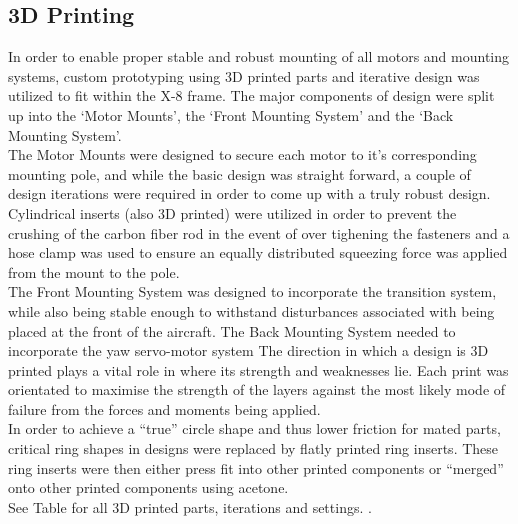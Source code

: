 \subsection{3D Printing}
In order to enable proper stable and robust mounting of all motors and mounting systems, custom prototyping using 3D printed parts and iterative design was utilized to fit within the X-8 frame. The major components of design were split up into the `Motor Mounts', the `Front  Mounting System' and the `Back Mounting System'.\\
The Motor Mounts were designed to secure each motor to it's corresponding mounting pole, and while the basic design was straight forward, a couple of design iterations were required in order to come up with a truly robust design. Cylindrical inserts (also 3D printed) were utilized in order to prevent the crushing of the carbon fiber rod in the event of over tighening the fasteners and a hose clamp was used to ensure an equally distributed squeezing force was applied from the mount to the pole.\\
The Front Mounting System was designed to incorporate the transition system, while also being stable enough to withstand disturbances associated with being placed at the front of the aircraft.
The Back Mounting System needed to incorporate the yaw servo-motor system
The direction in which a design is 3D printed plays a vital role in where its strength and weaknesses lie. Each print was orientated to maximise the strength of the layers against the most likely mode of failure from the forces and moments being applied.\\
In order to achieve a ``true'' circle shape and thus lower friction for mated parts, critical ring shapes in designs were replaced by flatly printed ring inserts. These ring inserts were then either press fit into other printed components or ``merged'' onto other printed components using acetone.\\
See Table \red{[REF]} for all 3D printed parts, iterations and settings.  .

	

